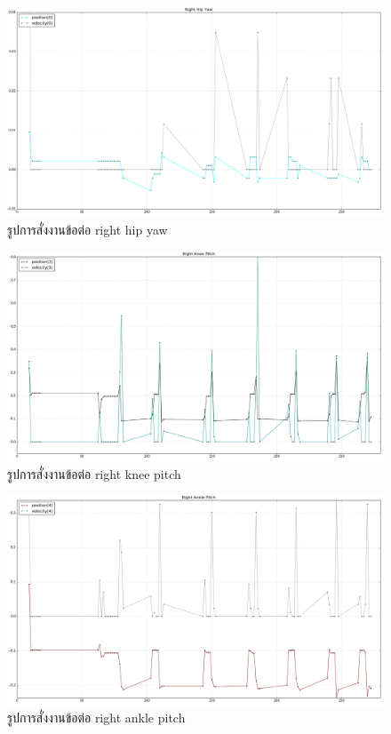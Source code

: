\begin{figure}[!ht]
  \centering
  \includegraphics[width=1.0\linewidth]{chapter4/images/right_hip_yaw.png}
  \caption{รูปการสั่งงานข้อต่อ right hip yaw}
  \label{fig:right_hip_yaw}
\end{figure}
\clearpage

\begin{figure}[!ht]
  \centering
  \includegraphics[width=1.0\linewidth]{chapter4/images/right_knee_pitch.png}
  \caption{รูปการสั่งงานข้อต่อ right knee pitch}
  \label{fig:right_knee_pitch}
\end{figure}

\begin{figure}[!ht]
  \centering
  \includegraphics[width=1.0\linewidth]{chapter4/images/right_ankle_pitch.png}
  \caption{รูปการสั่งงานข้อต่อ right ankle pitch}
  \label{fig:right_ankle_pitch}
\end{figure}
\clearpage

